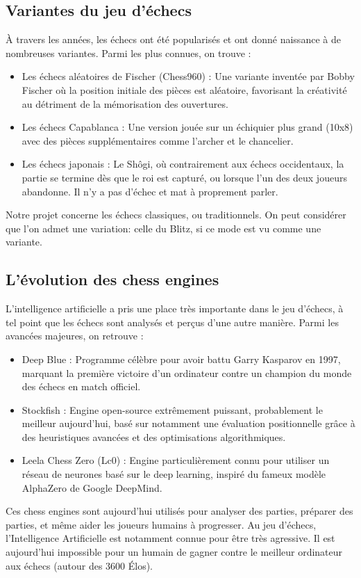 \documentclass{article}
\begin{document}
\subsection{Variantes du jeu d'échecs}
À travers les années, les échecs ont été popularisés et ont donné naissance à de nombreuses variantes. Parmi les plus connues, on trouve :
\begin{itemize}
    \item Les échecs aléatoires de Fischer (Chess960) : Une variante inventée par Bobby Fischer où la position initiale des pièces est aléatoire,
    favorisant la créativité au détriment de la mémorisation des ouvertures.
    \item Les échecs Capablanca : Une version jouée sur un échiquier plus grand (10x8) avec des pièces supplémentaires comme l'archer et le chancelier.
    \item Les échecs japonais : Le Shôgi, où contrairement aux échecs occidentaux, la partie se termine dès que le roi est capturé, ou lorsque l'un
    des deux joueurs abandonne. Il n'y a pas d'échec et mat à proprement parler.
\end{itemize}
Notre projet concerne les échecs classiques, ou traditionnels. On peut considérer que l'on admet une variation: celle du Blitz, si ce mode
est vu comme une variante.

\subsection{L’évolution des chess engines}
L’intelligence artificielle a pris une place très importante dans le jeu d'échecs, à tel point que les échecs
sont analysés et perçus d'une autre manière. Parmi les avancées majeures, on retrouve :
\begin{itemize}
    \item Deep Blue : Programme célèbre pour avoir battu Garry Kasparov en 1997, marquant la première victoire d'un ordinateur contre un
    champion du monde des échecs en match officiel.
    \item Stockfish : Engine open-source extrêmement puissant, probablement le meilleur aujourd'hui, basé sur notamment une évaluation positionnelle
    grâce à des heuristiques avancées et des optimisations algorithmiques.
    \item Leela Chess Zero (Lc0) : Engine particulièrement connu pour utiliser un réseau de neurones basé sur le deep learning, inspiré du fameux
    modèle AlphaZero de Google DeepMind.
\end{itemize}
Ces chess engines sont aujourd’hui utilisés pour analyser des parties, préparer des parties, et même aider les
joueurs humains à progresser. Au jeu d'échecs, l'Intelligence Artificielle est notamment connue pour être très agressive.
Il est aujourd'hui impossible pour un humain de gagner contre le meilleur ordinateur aux échecs (autour des 3600 Élos).
\end{document}
